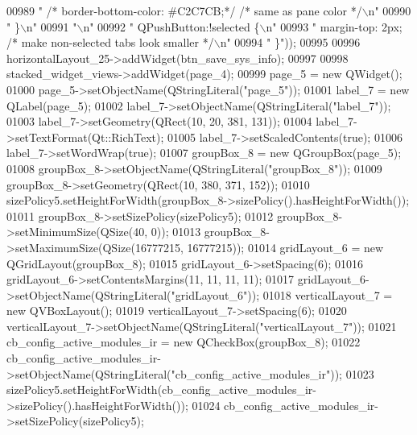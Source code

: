 \begin{DoxyCode}
00989 \textcolor{stringliteral}{"   /*  border-bottom-color: #C2C7CB;*/ /* same as pane color */\(\backslash\)n"}
00990 \textcolor{stringliteral}{" \}\(\backslash\)n"}
00991 \textcolor{stringliteral}{"\(\backslash\)n"}
00992 \textcolor{stringliteral}{" QPushButton:!selected \{\(\backslash\)n"}
00993 \textcolor{stringliteral}{"     margin-top: 2px; /* make non-selected tabs look smaller */\(\backslash\)n"}
00994 \textcolor{stringliteral}{" \}"}));
00995 
00996         horizontalLayout\_25->addWidget(btn\_save\_sys\_info);
00997 
00998         stacked\_widget\_views->addWidget(page\_4);
00999         page\_5 = \textcolor{keyword}{new} QWidget();
01000         page\_5->setObjectName(QStringLiteral(\textcolor{stringliteral}{"page\_5"}));
01001         label\_7 = \textcolor{keyword}{new} QLabel(page\_5);
01002         label\_7->setObjectName(QStringLiteral(\textcolor{stringliteral}{"label\_7"}));
01003         label\_7->setGeometry(QRect(10, 20, 381, 131));
01004         label\_7->setTextFormat(Qt::RichText);
01005         label\_7->setScaledContents(\textcolor{keyword}{true});
01006         label\_7->setWordWrap(\textcolor{keyword}{true});
01007         groupBox\_8 = \textcolor{keyword}{new} QGroupBox(page\_5);
01008         groupBox\_8->setObjectName(QStringLiteral(\textcolor{stringliteral}{"groupBox\_8"}));
01009         groupBox\_8->setGeometry(QRect(10, 380, 371, 152));
01010         sizePolicy5.setHeightForWidth(groupBox\_8->sizePolicy().hasHeightForWidth());
01011         groupBox\_8->setSizePolicy(sizePolicy5);
01012         groupBox\_8->setMinimumSize(QSize(40, 0));
01013         groupBox\_8->setMaximumSize(QSize(16777215, 16777215));
01014         gridLayout\_6 = \textcolor{keyword}{new} QGridLayout(groupBox\_8);
01015         gridLayout\_6->setSpacing(6);
01016         gridLayout\_6->setContentsMargins(11, 11, 11, 11);
01017         gridLayout\_6->setObjectName(QStringLiteral(\textcolor{stringliteral}{"gridLayout\_6"}));
01018         verticalLayout\_7 = \textcolor{keyword}{new} QVBoxLayout();
01019         verticalLayout\_7->setSpacing(6);
01020         verticalLayout\_7->setObjectName(QStringLiteral(\textcolor{stringliteral}{"verticalLayout\_7"}));
01021         cb\_config\_active\_modules\_ir = \textcolor{keyword}{new} QCheckBox(groupBox\_8);
01022         cb\_config\_active\_modules\_ir->setObjectName(QStringLiteral(\textcolor{stringliteral}{"cb\_config\_active\_modules\_ir"}));
01023         sizePolicy5.setHeightForWidth(cb\_config\_active\_modules\_ir->sizePolicy().hasHeightForWidth());
01024         cb\_config\_active\_modules\_ir->setSizePolicy(sizePolicy5);

\end{DoxyCode}
